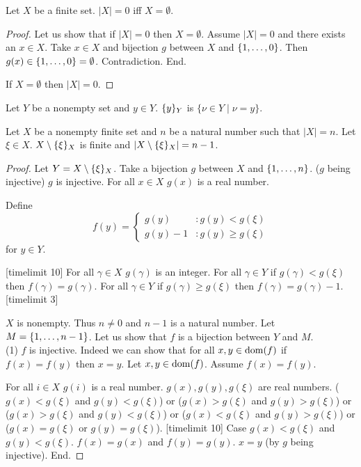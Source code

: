 \documentclass{article}
\begin{document}
\begin{forthel}
\begin{lemma}
Let $X$ be a finite set.
$|X| = 0$ iff $X = \emptyset$.
\end{lemma}
\begin{proof}
Let us show that if $|X| = 0$ then $X = \emptyset$.
  Assume $|X| = 0$ and there exists an $x \in X$.
  Take $x \in X$ and bijection $g$ between $X$ and $\{1,\dots,0\}$. Then $g(x) \in \{1,\dots,0\} = \emptyset$. Contradiction. End.

If $X = \emptyset$ then $|X| = 0$. 
\end{proof}


\begin{definition}
Let $Y$ be a nonempty set and $y \in Y$. 
$\{y\}_{Y}$ is $\{\nu \in Y \mid \nu=y \}$.
\end{definition}

\begin{proposition}
Let $X$ be a nonempty finite set and $n$ be a natural number such that $|X| = n$. Let $\xi \in X$.
$X \setminus \{\xi\}_{X}$ is finite and $|X \setminus \{\xi\}_{X}| = n - 1$.
\end{proposition}
\begin{proof}  
Let $Y = X \setminus \{\xi\}_{X}$. Take a bijection $g$ between $X$ and $\{1,\dots,n\}$. 
($g$ being injective) $g$ is injective. For all $x \in X$ $g(x)$ is a real number.

Define $$f(y) = \begin{cases} 
    g(y)      & : g(y) < g(\xi) \\
    g(y) - 1  & : g(y) \geq g(\xi)  \end{cases}$$
for $y \in Y$.

[timelimit 10] For all $\gamma \in X$ $g(\gamma)$ is an integer.
For all $\gamma \in Y$ if $g(\gamma) < g(\xi)$ then $f(\gamma) = g(\gamma)$.
For all $\gamma \in Y$ if $g(\gamma) \geq g(\xi)$ then $f(\gamma) = g(\gamma) - 1$.[timelimit 3]

$X$ is nonempty. Thus $n \neq 0$ and $n - 1$ is a natural number. Let $M=\{1,\dots,n-1\}$.
Let us show that $f$ is a bijection between $Y$ and $M$.\\

  (1) $f$ is injective.
  Indeed we can show that for all $x,y \in \operatorname{dom}(f)$ if $f(x) = f(y)$ then $x = y$.
    Let $x,y \in \operatorname{dom}(f)$. Assume $f(x) = f(y)$.
    
    For all $i \in X$ $g(i)$ is a real number. $g(x), g(y), g(\xi)$ are real numbers.
    ($g(x) < g(\xi)$ and $g(y) < g(\xi)$) or ($g(x) > g(\xi)$ and $g(y) > g(\xi)$) or 
      ($g(x) > g(\xi)$ and $g(y) < g(\xi)$) or ($g(x) < g(\xi)$ and $g(y) > g(\xi)$) or ($g(x) = g(\xi)$ or $g(y) = g(\xi)$). 
    [timelimit 10]
    Case $g(x) < g(\xi)$ and $g(y) < g(\xi)$. $f(x) = g(x)$ and $f(y) = g(y)$. $x = y$ (by $g$ being injective). End.
    

\end{proof}
\end{forthel}
\end{document}
